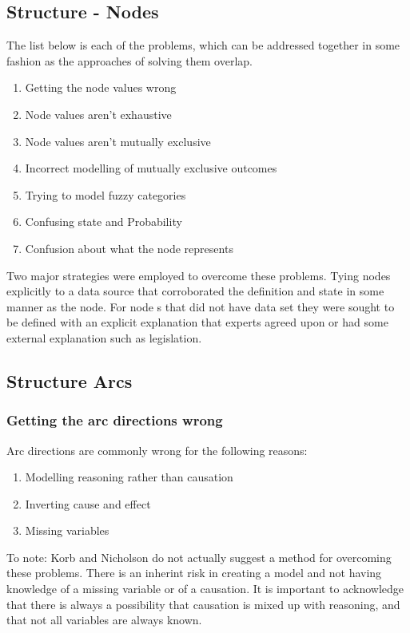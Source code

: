 \subsection{Structure - Nodes}
The list below is each of the problems, which can be addressed together in some fashion as the approaches of solving them overlap.
\begin{enumerate}
        \item Getting the node values wrong
        \item Node values aren't exhaustive
        \item Node values aren't mutually exclusive
        \item Incorrect modelling of mutually exclusive outcomes
        \item Trying to model fuzzy categories
        \item Confusing state and Probability
        \item Confusion about what the node represents
\end{enumerate}
Two major strategies were employed to overcome these problems. Tying nodes explicitly to a data source that corroborated the definition and state in some manner as the node. For node s that did not have data set they were sought to be defined with an explicit explanation that experts agreed upon or had some external explanation such as legislation.

\subsection{Structure Arcs}
\subsubsection{Getting the arc directions wrong}
Arc directions are commonly wrong for the following reasons:
\begin{enumerate}
        \item Modelling reasoning rather than causation
        \item Inverting cause and effect
        \item Missing variables
\end{enumerate}
To note: Korb and Nicholson do not actually suggest a method for overcoming these problems. There is an inherint risk in creating a model and not having knowledge of a missing variable or of a causation. It is important to acknowledge that there is always a possibility that causation is mixed up with reasoning, and that not all variables are always known.
